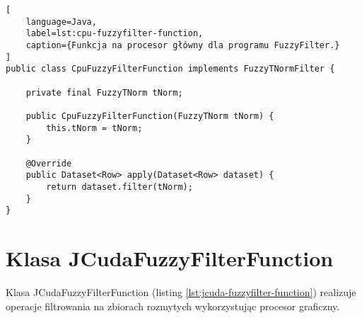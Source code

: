 \begin{lstlisting}[
    language=Java,
    label=lst:cpu-fuzzyfilter-function,
    caption={Funkcja na procesor główny dla programu FuzzyFilter.}
]
public class CpuFuzzyFilterFunction implements FuzzyTNormFilter {

    private final FuzzyTNorm tNorm;

    public CpuFuzzyFilterFunction(FuzzyTNorm tNorm) {
        this.tNorm = tNorm;
    }

    @Override
    public Dataset<Row> apply(Dataset<Row> dataset) {
        return dataset.filter(tNorm);
    }
}
\end{lstlisting}
\newpage

\section*{Klasa JCudaFuzzyFilterFunction} \label{ch:jcuda-fuzzyfilter-function}

Klasa JCudaFuzzyFilterFunction (listing \ref{lst:jcuda-fuzzyfilter-function})
realizuje operacje filtrowania na zbiorach rozmytych wykorzystując procesor graficzny.

